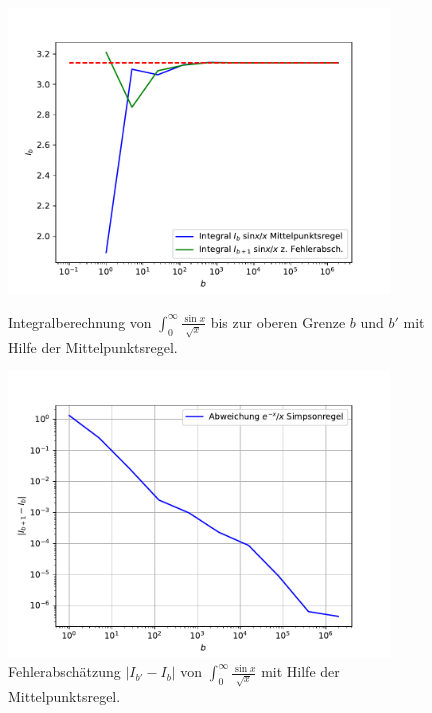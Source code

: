 \begin{figure}[h!]
\begin{minipage}{0.45\textwidth}
\includegraphics[width=0.9\textwidth]{A1/build/1c.pdf}
\caption{Integralberechnung von $\int_0^{\infty}\frac{\sin{x}}{\sqrt{x}}$ bis zur oberen Grenze $b$ und $b'$ mit Hilfe der Mittelpunktsregel.}
\label{fig:1c}
\end{minipage}
\begin{minipage}{0.45\textwidth}
\includegraphics[width=0.9\textwidth]{A1/build/1c_err.pdf}
\caption{Fehlerabschätzung $|I_{b'}-I_b|$ von $\int_0^{\infty}\frac{\sin{x}}{\sqrt{x}}$ mit Hilfe der Mittelpunktsregel.}
\label{fig:1c_err}
\end{minipage}
\end{figure}